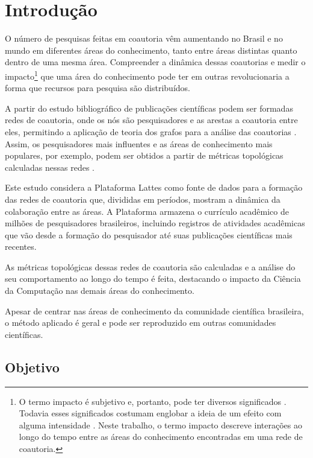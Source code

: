 \chapter[Introdução]{Introdução}

O número de pesquisas feitas em coautoria vêm aumentando no Brasil \cite{mena2014brazilian} e no mundo \cite{glanzel2003bibliometrics} em diferentes áreas do conhecimento, tanto entre áreas distintas quanto dentro de uma mesma área. Compreender a dinâmica dessas coautorias e medir o impacto\footnote{O termo impacto é subjetivo e, portanto, pode ter diversos significados \cite{roemer2015meaningful}. Todavia esses significados costumam englobar a ideia de um efeito com alguma intensidade \cite{roemer2015meaningful}. Neste trabalho, o termo impacto descreve interações ao longo do tempo entre as áreas do conhecimento encontradas em uma rede de coautoria.} que uma área do conhecimento pode ter em outras revolucionaria a forma que recursos para pesquisa são distribuídos.

A partir do estudo bibliográfico de publicações científicas podem ser formadas redes de coautoria, onde os nós são pesquisadores e as arestas a coautoria entre eles, permitindo a aplicação de teoria dos grafos para a análise das coautorias \cite{liu2005co}. Assim, os pesquisadores mais influentes e as áreas de conhecimento mais populares, por exemplo, podem ser obtidos a partir de métricas topológicas calculadas nessas redes \cite{franceschet2011collaboration}.

Este estudo considera a Plataforma Lattes como fonte de dados para a formação das redes de coautoria que, divididas em períodos, mostram a dinâmica da colaboração entre as áreas. A Plataforma armazena o currículo acadêmico de milhões de pesquisadores brasileiros, incluindo registros de atividades acadêmicas que vão desde a formação do pesquisador até suas publicações científicas mais recentes.

As métricas topológicas dessas redes de coautoria são calculadas e a análise do seu comportamento ao longo do tempo é feita, destacando o impacto da Ciência da Computação nas demais áreas do conhecimento.

Apesar de centrar nas áreas de conhecimento da comunidade científica brasileira, o método aplicado é geral e pode ser reproduzido em outras comunidades científicas.

\section{Objetivo}

